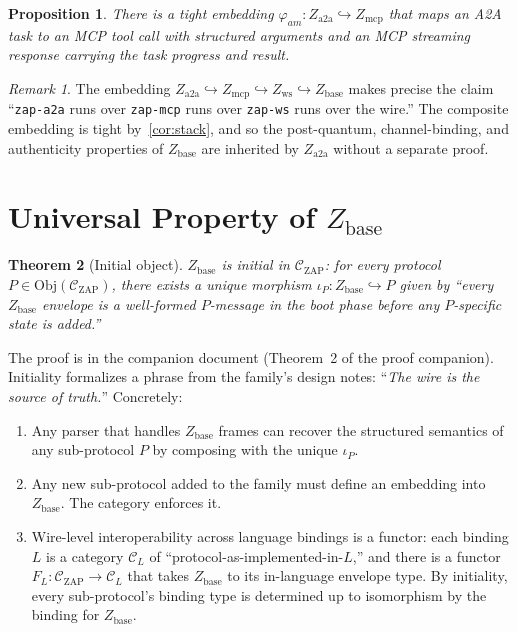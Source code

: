 \documentclass[11pt]{article}
\newtheorem{theorem}{Theorem}
\newtheorem{proposition}[theorem]{Proposition}
\theoremstyle{definition}
\theoremstyle{remark}
\newtheorem*{remark}{Remark}
\newcommand{\CZ}{\mathcal{C}_{\mathrm{ZAP}}}
\newcommand{\Zb}{Z_{\mathrm{base}}}
\newcommand{\Zw}{Z_{\mathrm{ws}}}
\newcommand{\Zm}{Z_{\mathrm{mcp}}}
\newcommand{\Za}{Z_{\mathrm{a2a}}}
\begin{document}
\begin{proposition}
\label{prop:a2a-mcp}
There is a tight embedding $\varphi_{am} : \Za \hookrightarrow \Zm$
that maps an A2A task to an MCP tool call with structured arguments
and an MCP streaming response carrying the task progress and result.
\end{proposition}

\begin{remark}
The embedding $\Za \hookrightarrow \Zm \hookrightarrow \Zw
\hookrightarrow \Zb$ makes precise the claim
``\texttt{zap-a2a} runs over \texttt{zap-mcp} runs over
\texttt{zap-ws} runs over the wire.'' The composite embedding is
tight by~\cref{cor:stack}, and so the post-quantum, channel-binding,
and authenticity properties of $\Zb$ are inherited by $\Za$ without a
separate proof.
\end{remark}

\section{Universal Property of $\Zb$}
\label{sec:universal}

\begin{theorem}[Initial object]
\label{thm:initial}
$\Zb$ is initial in $\CZ$: for every protocol $P \in
\mathrm{Obj}(\CZ)$, there exists a unique morphism
$\iota_P : \Zb \hookrightarrow P$ given by ``every $\Zb$ envelope is a
well-formed $P$-message in the boot phase before any $P$-specific
state is added.''
\end{theorem}

The proof is in the companion document (Theorem~2 of the proof
companion). Initiality formalizes a phrase from the family's design notes:
``\emph{The wire is the source of truth.}'' Concretely:

\begin{enumerate}
\item Any parser that handles $\Zb$ frames can recover the structured
semantics of any sub-protocol $P$ by composing with the unique
$\iota_P$.
\item Any new sub-protocol added to the family must define an
embedding into $\Zb$. The category enforces it.
\item Wire-level interoperability across language bindings is a
functor: each binding $L$ is a category $\mathcal{C}_L$ of
``protocol-as-implemented-in-$L$,'' and there is a functor $F_L :
\CZ \to \mathcal{C}_L$ that takes $\Zb$ to its in-language envelope
type. By initiality, every sub-protocol's binding type is determined
up to isomorphism by the binding for $\Zb$.
\end{enumerate}
\end{document}
